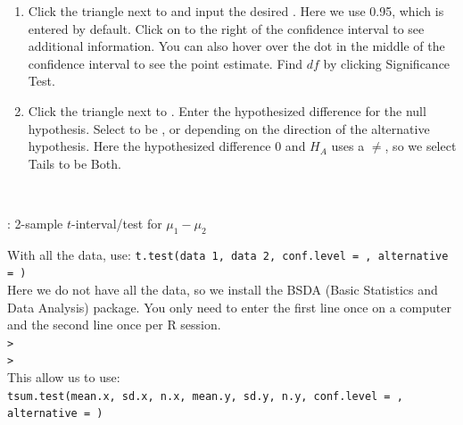 \begin{enumerate}
\item Click the triangle next to  and input the desired .  Here we use 0.95, which is entered by default.  Click on \calctext{\vdots } to the right of the confidence interval to see additional information.  You can also hover over the dot in the middle of the confidence interval to see the point estimate.  Find $df$ by clicking Significance Test.
\item Click the triangle next to .  Enter the hypothesized difference for the null hypothesis.  Select  to be ,  or  depending on the direction of the alternative hypothesis.  Here the hypothesized difference 0 and $H_A$ uses a $\ne$, so we select Tails to be Both.  
\begin{center}
\hspace{5mm}
\\
\end{center}
\end{enumerate}

\noindent \R{}:   2-sample $t$-interval/test for $\mu_1-\mu_2$

\noindent With all the data, use: \texttt{t.test(data 1, data 2, conf.level =  , alternative = )} \\

\noindent Here we do not have all the data, so we install the BSDA (Basic Statistics and Data Analysis) package.  You only need to enter the first line once on a computer and the second line once per R session.\\
\noindent \texttt{> }\\
\texttt{> } \\ 
This allow us to use:\\
 \texttt{tsum.test(mean.x, sd.x, n.x, mean.y, sd.y, n.y, conf.level = , alternative = )}\\

